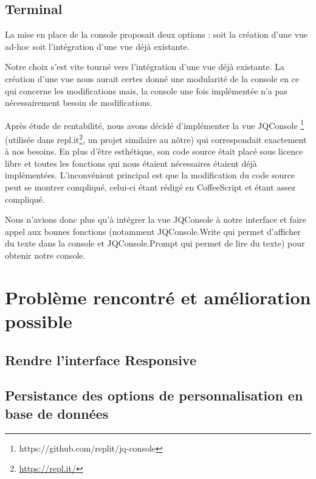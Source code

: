 \subsection{Terminal}
\label{subsec-terminal}

\par La mise en place de la console proposait deux options : soit la création d'une vue ad-hoc soit l'intégration d'une vue déjà existante.

\par Notre choix s'est vite tourné vers l'intégration d'une vue déjà existante. La création d'une vue nous aurait certes donné une modularité de la console en ce qui concerne les modifications mais, la console une fois implémentée n'a pas nécessairement besoin de modifications.

\par Après étude de rentabilité, nous avons décidé d'implémenter la vue JQConsole \footnote{https://github.com/replit/jq-console} (utilisée dans repl.it\footnote{\url{https://repl.it/}}, un projet similaire au nôtre) qui correspondait exactement à nos besoins. En plus d'être esthétique, son code source était placé sous licence libre et toutes les fonctions qui nous étaient nécessaires étaient déjà implémentées. L'inconvénient principal est que la modification du code source peut se montrer compliqué, celui-ci étant rédigé en CoffeeScript et étant assez compliqué.

\par Nous n'avions donc plus qu'à intégrer la vue JQConsole à notre interface et faire appel aux bonnes fonctions (notamment JQConsole.Write qui permet d'afficher du texte dans la console et JQConsole.Prompt qui permet de lire du texte) pour obtenir notre console.

\section{Problème rencontré et amélioration possible}

\subsection{Rendre l'interface Responsive}

\subsection{Persistance des options de personnalisation en base de données}

